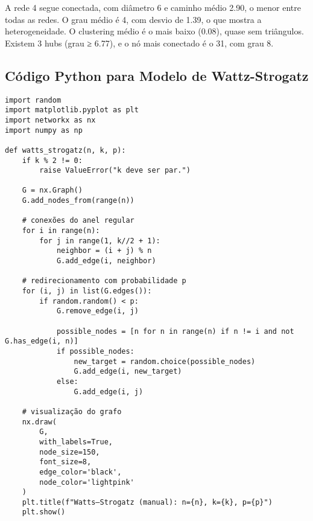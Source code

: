 \documentclass[a4paper]{article}
\begin{document}
A rede 4 segue conectada, com diâmetro 6 e caminho médio 2.90, o menor entre todas as redes. O grau médio é 4, com desvio de 1.39, o que mostra a heterogeneidade. O clustering médio é o mais baixo (0.08), quase sem triângulos. Existem 3 hubs (grau ≥ 6.77), e o nó mais conectado é o 31, com grau 8.

\vspace{0.5cm}


\subsection{Código Python para Modelo de Wattz-Strogatz}

\begin{verbatim}
import random
import matplotlib.pyplot as plt
import networkx as nx
import numpy as np

def watts_strogatz(n, k, p):
    if k % 2 != 0:
        raise ValueError("k deve ser par.")

    G = nx.Graph()
    G.add_nodes_from(range(n))

    # conexões do anel regular
    for i in range(n):
        for j in range(1, k//2 + 1):
            neighbor = (i + j) % n
            G.add_edge(i, neighbor)

    # redirecionamento com probabilidade p
    for (i, j) in list(G.edges()):
        if random.random() < p:
            G.remove_edge(i, j)

            possible_nodes = [n for n in range(n) if n != i and not G.has_edge(i, n)]
            if possible_nodes:
                new_target = random.choice(possible_nodes)
                G.add_edge(i, new_target)
            else:
                G.add_edge(i, j)

    # visualização do grafo
    nx.draw(
        G,
        with_labels=True,
        node_size=150,
        font_size=8,
        edge_color='black',
        node_color='lightpink'
    )
    plt.title(f"Watts–Strogatz (manual): n={n}, k={k}, p={p}")
    plt.show()


\end{verbatim}
\end{document}
